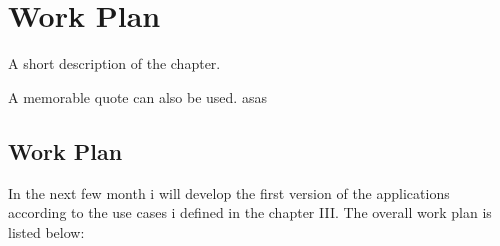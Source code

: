\chapter{Work Plan}%
\label{chapter:workPlan}

\begin{introduction}
A short description of the chapter.

A memorable quote can also be used. asas
\end{introduction} 


\section{Work Plan}

In the next few month i will develop the first version of the applications according to the use cases i defined in the chapter III. 
The overall work plan is listed below:  

